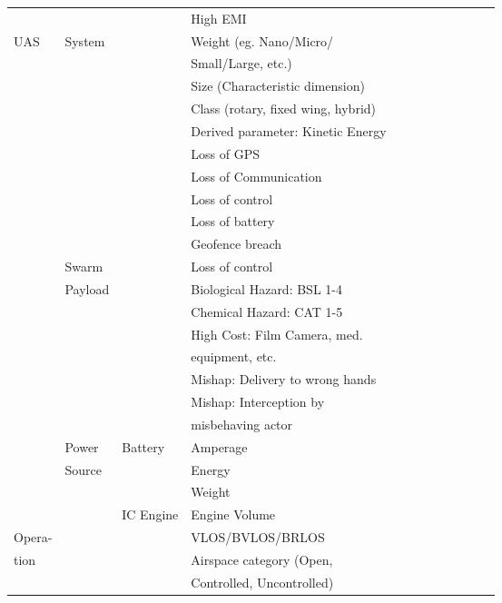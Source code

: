 \documentclass{report}
\begin{document}
\begin{centering}
\begin{longtable}{|l|l|l|l|c|c|c|c|c|c|c|c|}
  & & & High EMI & & & & & & & & \\\cline{1-4}
  \multirow{15}{3em}{UAS} & \multirow{5}{7em}{System} & & Weight (eg. Nano/Micro/ & & & & & & & & \\
  & & & Small/Large, etc.) & & & & & & & & \\\cline{4-4}
   & & & Size (Characteristic dimension) & & & & & & & & \\\cline{4-4}
   & & & Class (rotary, fixed wing, hybrid) & & & & & & & & \\\cline{4-4}
   & & & Derived parameter: Kinetic Energy & & & & & & & & \\\cline{4-4}
   & & & Loss of GPS & & & & & & & & \\\cline{4-4}
   & & & Loss of Communication & & & & & & & & \\\cline{4-4}
   & & & Loss of control & & & & & & & & \\\cline{4-4}
   & & & Loss of battery & & & & & & & & \\\cline{4-4}
   & & & Geofence breach & & & & & & & & \\\cline{2-4}
   & Swarm & & Loss of control & & & & & & & & \\\cline{2-4}
   & Payload & & Biological Hazard: BSL 1-4 & & & & & & & & \\\cline{4-4}
   & & & Chemical Hazard: CAT 1-5 & & & & & & & & \\\cline{4-4}
   & & & High Cost: Film Camera, med. & & & & & & & & \\
   & & & equipment, etc. & & & & & & & & \\\cline{4-4}
   & & & Mishap: Delivery to wrong hands & & & & & & & & \\\cline{4-4}
   & & & Mishap: Interception by & & & & & & & & \\
   & & & misbehaving actor  & & & & & & & & \\\cline{2-4}
   & Power & Battery & Amperage & & & & & & & & \\\cline{4-4}
   & Source & & Energy & & & & & & & & \\\cline{4-4}
   & & & Weight  & & & & & & & & \\\cline{3-4}
   & & IC Engine & Engine Volume  & & & & & & & & \\\cline{1-4}
   Opera- & & & VLOS/BVLOS/BRLOS & & & & & & & & \\\cline{4-4}
   tion & & & Airspace category (Open, & & & & & & & & \\
   & & & Controlled, Uncontrolled) & & & & & & & & \\\cline{4-4}

\end{longtable}
\end{centering}
\end{document}
